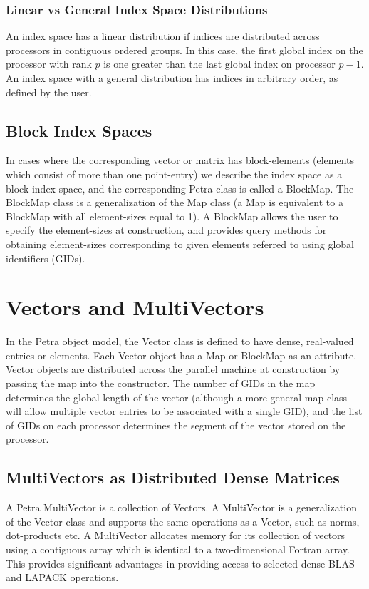 \documentclass[12pt,relax]{PetraObjectModel}
\begin{document}
\subsubsection{Linear vs General Index Space Distributions}
An index space has a linear distribution if indices are distributed across
processors in contiguous ordered groups. In this case, the first global index
on the processor with rank $p$ is one greater than the last global index on
processor $p-1$. An index space with
a general distribution has indices in arbitrary order, as defined by the user.

\subsection{Block Index Spaces}
In cases where the corresponding vector or matrix has block-elements (elements
which consist of more than one point-entry) we describe the index space as a
block index space, and the corresponding Petra class is called a BlockMap. The
BlockMap class is a generalization of the Map class (a Map is equivalent to a
BlockMap with all element-sizes equal to 1). A BlockMap allows the user to
specify the element-sizes at construction, and provides query methods for
obtaining element-sizes corresponding to given elements referred to using
global identifiers (GIDs).

\section{Vectors and MultiVectors}
In the Petra object model, the Vector class is defined to have dense,
real-valued entries or elements. Each Vector object has a Map or BlockMap as
an attribute.  Vector objects are distributed across the 
parallel machine at construction by passing the map into the constructor.  
The number of GIDs in the map determines the global length of the vector 
(although a more general map class will allow multiple vector entries to 
be associated with a single GID), and the list of GIDs on each processor 
determines the segment of the vector stored on the processor.

\subsection{MultiVectors as Distributed Dense Matrices}
A Petra MultiVector is a collection of Vectors. A MultiVector is a
generalization of the Vector class and supports the
same operations as a Vector, such as norms, dot-products etc. A MultiVector
allocates memory for its collection of vectors using a contiguous array which
is identical to a two-dimensional Fortran array. This provides significant
advantages in providing access to selected dense BLAS and LAPACK operations.
\end{document}
